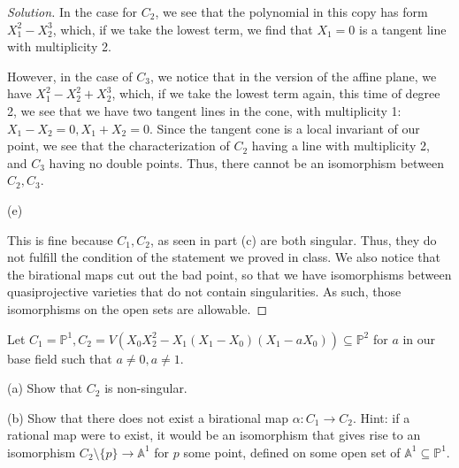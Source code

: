\documentclass[10pt]{article}
\newenvironment{problem}[2][Problem]{\begin{trivlist}
\item[\hskip \labelsep {\bfseries #1}\hskip \labelsep {\bfseries #2.}]}{\end{trivlist}}
\begin{document}
\begin{proof}[Solution]
In the case for $C_2$, we see that the polynomial in this copy has form $X_1^2 - X_2^3$, which, if we take the lowest term, we find that $X_1 = 0$ is a tangent line with multiplicity 2.

However, in the case of $C_3$, we notice that in the version of the affine plane, we have $X_1^2  -X_2^2 + X_2^3$, which, if we take the lowest term again, this time of degree 2, we see that we have two tangent lines in the cone, with multiplicity 1: $X_1 - X_2 = 0, X_1 + X_2 = 0$. Since the tangent cone is a local invariant of our point, we see that the characterization of $C_2$ having a line with multiplicity 2, and $C_3$ having no double points. Thus, there cannot be an isomorphism between $C_2, C_3$.


(e)

This is fine because $C_1, C_2$, as seen in part (c) are both singular. Thus, they do not fulfill the condition of the statement we proved in class. We also notice that the birational maps cut out the bad point, so that we have isomorphisms between quasiprojective varieties that do not contain singularities. As such, those isomorphisms on the open sets are allowable.

\end{proof}

\begin{problem}{8.3}

Let $C_1 = \mathbb{P}^1, C_2 = V(X_0X_2^2 - X_1(X_1 - X_0)(X_1 - aX_0)) \subseteq \mathbb{P}^2$ for $a$ in our base field such that $a \not = 0, a \not = 1$.

(a) Show that $C_2$ is non-singular. 

(b) Show that there does not exist a birational map $\alpha: C_1 \to C_2$. Hint: if a rational map were to exist, it would be an isomorphism that gives rise to an isomorphism $C_2 \setminus \{ p \} \to \mathbb{A}^1$ for $p$ some point, defined on some open set of $\mathbb{A}^1 \subseteq \mathbb{P}^1$.

\end{problem}
\end{document}
